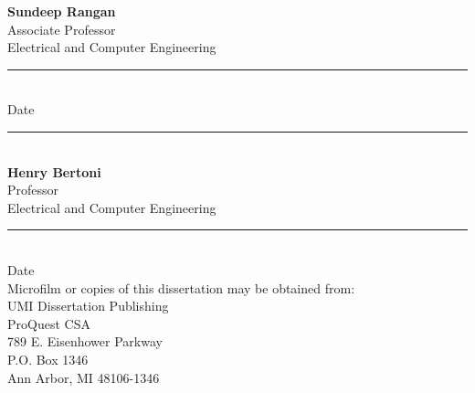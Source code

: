  \makebox[2.8in]{ } {\bf Sundeep Rangan} \vspace{0.05in} \\
 \makebox[2.8in]{ } Associate Professor \vspace{0.05in} \\
 \makebox[2.8in]{ } Electrical and Computer Engineering %
 \vspace{0.3in}  \\ 
 \makebox[2.8in]{ } \rule{2in}{.005in} \vspace{0.05in} \\
 \makebox[3.6in]{ } Date \vspace{0.6in}\\
 \makebox[2.8in]{ } \rule{2.5in}{.005in} \vspace{0.05in} \\
 \makebox[2.8in]{ } {\bf Henry Bertoni} \vspace{0.05in} \\
 \makebox[2.8in]{ } Professor \vspace{0.05in} \\
 \makebox[2.8in]{ } Electrical and Computer Engineering %
 \vspace{0.3in}  \\ 
 \makebox[2.8in]{ } \rule{2in}{.005in} \vspace{0.05in} \\
 \makebox[3.6in]{ } Date \\

\newpage {}\baselineskip \vspace*{2.2in}
 \noindent
Microfilm or copies of this dissertation may be obtained from:
\\

 \vspace*{0.6in}
 \noindent
 \makebox[1.5in]{ } UMI Dissertation Publishing \vspace{0.1in} \\
 \makebox[1.5in]{ } ProQuest CSA \vspace{0.1in} \\
 \makebox[1.5in]{ } 789 E. Eisenhower Parkway \vspace{0.1in} \\
 \makebox[1.5in]{ } P.O. Box 1346 \vspace{0.1in} \\
 \makebox[1.5in]{ } Ann Arbor, MI 48106-1346

